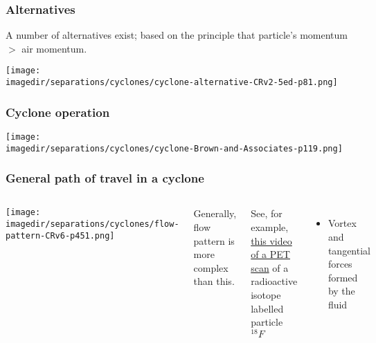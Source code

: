 \begin{frame}\frametitle{Alternatives}
	A number of alternatives exist; based on the principle that particle's momentum $>$ air momentum. {\color{myBlue}{Other options?}}
	
	\begin{center}
		\texttt{[image: \\imagedir/separations/cyclones/cyclone-alternative-CRv2-5ed-p81.png]}
	\end{center}	
\end{frame}

\begin{frame}\frametitle{Cyclone operation}
	\begin{center}
		\texttt{[image: \\imagedir/separations/cyclones/cyclone-Brown-and-Associates-p119.png]}
	\end{center}
\end{frame}

\begin{frame}\frametitle{General path of travel in a cyclone {}}
	\begin{columns}[c]
			\begin{center}
				\texttt{[image: \\imagedir/separations/cyclones/flow-pattern-CRv6-p451.png]}
			\end{center}
			Generally, flow pattern is more complex than this. 
			
			\vspace{12pt}			
			See, for example, \href{http://www.youtube.com/watch?v=CWLARs\_dJO0}{this video of a PET scan} of a radioactive isotope labelled particle $^{18}F$
			
			\vspace{12pt}
			\begin{itemize}
				\item	Vortex and tangential forces formed by the fluid
			\end{itemize}
	\end{columns}
\end{frame}

